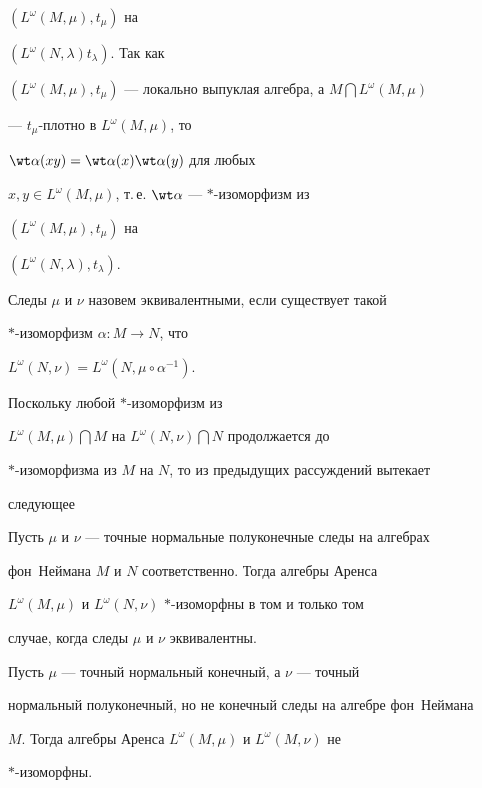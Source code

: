 $(L^\omega(M,\mu),t_\mu)$ на 


$(L^\omega(N,\lambda)t_\lambda)$. Так как 


$(L^\omega(M,\mu),t_\mu)$ --- локально выпуклая алгебра, а $M\bigcap 


L^\omega(M,\mu)$ 


--- $t_\mu$-плотно в $L^\omega(M,\mu)$, то 


$\wt\alpha(xy)=\wt\alpha(x)\wt\alpha(y)$ для любых 


$x,y\in L^\omega(M,\mu)$, т.\,е.{} $\wt\alpha$ --- $*$-изоморфизм из 


$(L^\omega(M,\mu),t_\mu)$ на 


$(L^\omega(N,\lambda),t_\lambda)$. 


 


\begin{defnnonum} 


Следы $\mu$ и $\nu$ назовем эквивалентными, если существует такой 


$*$-изоморфизм $\alpha:M\to N$, что 


$L^\omega(N,\nu)=L^\omega(N,\mu\circ\alpha^{-1})$. 


\end{defnnonum} 


 


Поскольку любой $*$-изоморфизм из 


$L^\omega(M,\mu)\bigcap M$ на $L^\omega(N,\nu)\bigcap N$ продолжается до 


$*$-изо\-мор\-физма из $M$ на $N$, то из предыдущих рассуждений вытекает 


следующее  


 


\begin{propnonum} 


Пусть $\mu$ и $\nu$ --- точные нормальные полуконечные следы на алгебрах 


фон~Неймана $M$ и $N$ соответственно. Тогда алгебры Аренса 


$L^\omega(M,\mu)$ и $L^\omega(N,\nu)$\; $*$-изоморфны в том и только том 


случае, когда следы $\mu$ и $\nu$ эквивалентны. 


\end{propnonum} 


 


\begin{thm} 


Пусть $\mu$ --- точный нормальный конечный, а $\nu$ --- точный 


нормальный полуконечный, но не конечный следы на алгебре фон~Неймана 


$M$. Тогда алгебры Аренса $L^\omega(M,\mu)$ и $L^\omega(M,\nu)$ не 


$*$-изоморфны. 


\end{thm} 


